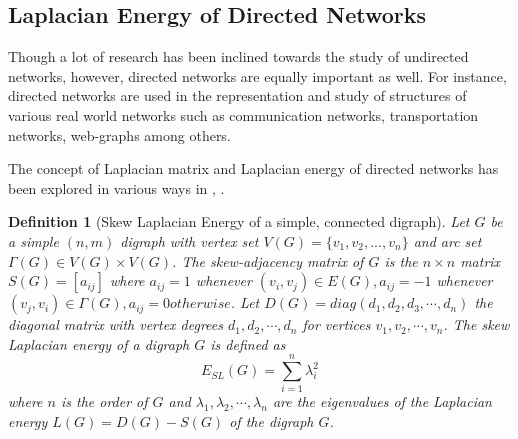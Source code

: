 \documentclass[10pt,a4paper]{article}
\newtheorem{defn}{Definition}
\begin{document}
\subsection{Laplacian Energy of Directed Networks}
Though a lot of research has been inclined towards the study of undirected networks, however, directed networks are equally important as well. For instance, directed  networks are used in the representation and study of structures of various real world networks such as communication networks, transportation networks, web-graphs among others.

The concept of Laplacian matrix and Laplacian energy of directed networks has been explored in various ways in \cite{kissani2010laplacian}, \cite{adiga2009skew}.

\begin{defn}[Skew Laplacian Energy of a simple, connected digraph] \cite{adiga2009skew}
	Let $G$ be a simple $(n, m)$ digraph with vertex set $V(G)=\{v_1,v_2, ..., v_n\}$ and arc set $\Gamma(G)\in V(G)\times V(G)$. 
	The skew-adjacency matrix of $G$ is the $n \times n$ matrix $S(G)=[
	a_{ij}]$ where $a_{ij}= 1$ whenever $(v_i,v_j)\in E(G),a_{ij}=-1$
	whenever $(v_j,v_i)\in \Gamma(G),a_{ij}= 0 otherwise$. Let $D(G)= diag(d_1,d_2,d_3, \cdots, d_n)$ the diagonal matrix with vertex degrees $d_1,d_2, \cdots, d_n$ for vertices $v_1,v_2, \cdots, v_n$. The skew Laplacian energy of a digraph $G$ is defined as
	\begin{equation}
	E_{SL}(G) = \sum_{i=1}^n \lambda_i ^2
	\end{equation}
	where $n$ is the order of $G$ and $\lambda_1,\lambda_2,\cdots, \lambda_n$ are the eigenvalues of the Laplacian energy $L(G)=D(G)-S(G)$ of the digraph $G$.
\end{defn}
\end{document}
